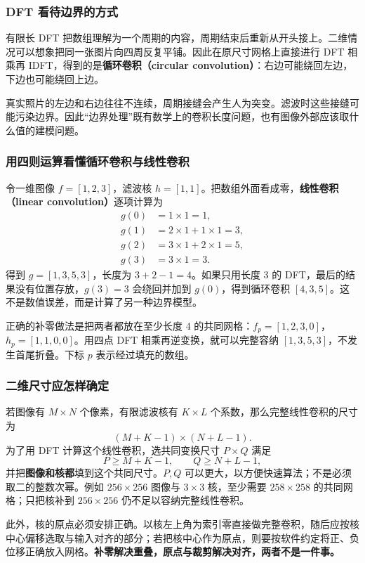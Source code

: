 \subsubsection{DFT 看待边界的方式}
有限长 DFT 把数组理解为一个周期的内容，周期结束后重新从开头接上。二维情况可以想象把同一张图片向四周反复平铺。因此在原尺寸网格上直接进行 DFT 相乘再 IDFT，得到的是\textbf{循环卷积（circular convolution）}：右边可能绕回左边，下边也可能绕回上边。

真实照片的左边和右边往往不连续，周期接缝会产生人为突变。滤波时这些接缝可能污染边界。因此“边界处理”既有数学上的卷积长度问题，也有图像外部应该取什么值的建模问题。

\subsubsection{用四则运算看懂循环卷积与线性卷积}
令一维图像 $f=[1,2,3]$，滤波核 $h=[1,1]$。把数组外面看成零，\textbf{线性卷积（linear convolution）}逐项计算为
\[
\begin{aligned}
g(0)&=1\times1=1,\\
g(1)&=2\times1+1\times1=3,\\
g(2)&=3\times1+2\times1=5,\\
g(3)&=3\times1=3.
\end{aligned}
\]
得到 $g=[1,3,5,3]$，长度为 $3+2-1=4$。如果只用长度 3 的 DFT，最后的结果没有位置存放，$g(3)=3$ 会绕回并加到 $g(0)$，得到循环卷积 $[4,3,5]$。这不是数值误差，而是计算了另一种边界模型。

正确的补零做法是把两者都放在至少长度 4 的共同网格：$f_p=[1,2,3,0]$，$h_p=[1,1,0,0]$。用四点 DFT 相乘再逆变换，就可以完整容纳 $[1,3,5,3]$，不发生首尾折叠。下标 $p$ 表示经过填充的数组。

\subsubsection{二维尺寸应怎样确定}
若图像有 $M\times N$ 个像素，有限滤波核有 $K\times L$ 个系数，那么完整线性卷积的尺寸为
\[
(M+K-1)\times(N+L-1).
\]
为了用 DFT 计算这个线性卷积，选共同变换尺寸 $P\times Q$ 满足
\[
P\geq M+K-1,\qquad Q\geq N+L-1,
\]
并把\textbf{图像和核都}填到这个共同尺寸。$P,Q$ 可以更大，以方便快速算法；不是必须取二的整数次幂。例如 $256\times256$ 图像与 $3\times3$ 核，至少需要 $258\times258$ 的共同网格；只把核补到 $256\times256$ 仍不足以容纳完整线性卷积。

此外，核的原点必须安排正确。以核左上角为索引零直接做完整卷积，随后应按核中心偏移选取与输入对齐的部分；若把核中心作为原点，则要按软件约定将正、负位移正确放入网格。\textbf{补零解决重叠，原点与裁剪解决对齐，两者不是一件事。}

